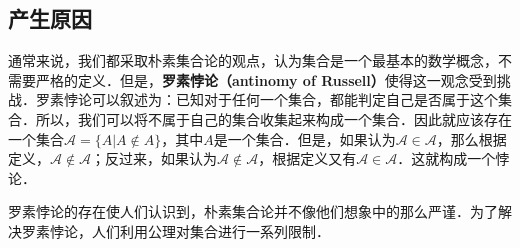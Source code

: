 \begin{issues}
\issueTODO
\end{issues}

\subsection{产生原因}
通常来说，我们都采取朴素集合论的观点，认为集合是一个最基本的数学概念，不需要严格的定义．但是，\textbf{罗素悖论（antinomy of Russell）}使得这一观念受到挑战．罗素悖论可以叙述为：已知对于任何一个集合，都能判定自己是否属于这个集合．所以，我们可以将不属于自己的集合收集起来构成一个集合．因此就应该存在一个集合$\mathcal{A}=\{A|A\notin A\}$，其中$A$是一个集合．但是，如果认为$\mathcal{A}\in\mathcal{A}$，那么根据定义，$\mathcal{A}\notin\mathcal{A}$；反过来，如果认为$\mathcal{A}\notin\mathcal{A}$，根据定义又有$\mathcal{A}\in\mathcal{A}$．这就构成一个悖论．

罗素悖论的存在使人们认识到，朴素集合论并不像他们想象中的那么严谨．为了解决罗素悖论，人们利用公理对集合进行一系列限制．

